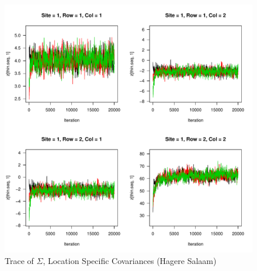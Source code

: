 \documentclass[11pt]{article}
\begin{document}



\begin{figure}[htbp]
\caption{Trace of $\Sigma$, Location Specific Covariances (Hagere Salaam) }
\begin{center}
\includegraphics[page=1,width=5.0in]{fig_tobit_trace_sigma_covariance.pdf}     
\end{center}
\end{figure}

\end{document}
